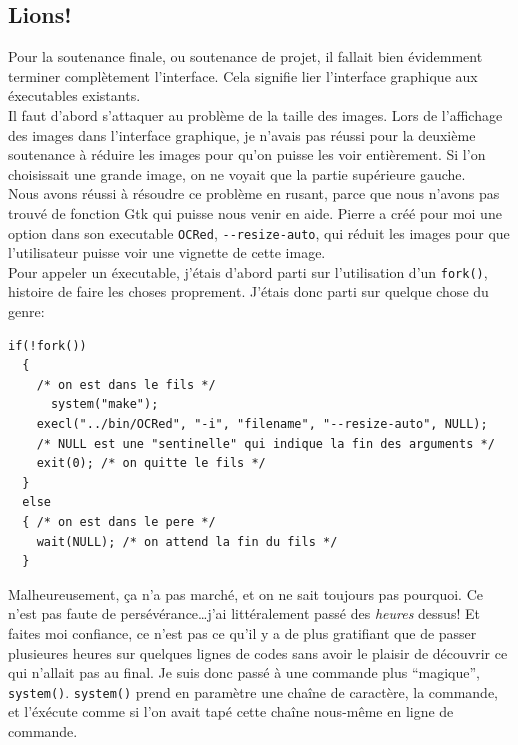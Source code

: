 \documentclass[a4paper,12pt]{report}
\begin{document}
\subsection{Lions!} %
\label{sub:lions_}
Pour la soutenance finale, ou soutenance de projet, il fallait bien \'evidemment terminer compl\`etement l'interface. Cela signifie lier l'interface graphique aux \'executables existants. \\
Il faut d'abord s'attaquer au probl\`eme de la taille des images. Lors de l'affichage des images dans l'interface graphique, je n'avais pas r\'eussi pour la deuxi\`eme soutenance \`a r\'eduire les images pour qu'on puisse les voir enti\`erement. Si l'on choisissait une grande image, on ne voyait que la partie sup\'erieure gauche.\\
Nous avons r\'eussi \`a r\'esoudre ce problème en rusant, parce que nous n'avons pas trouv\'e de fonction Gtk qui puisse nous venir en aide. Pierre a cr\'e\'e pour moi une option dans son executable \verb!OCRed!, \verb!--resize-auto!, qui r\'eduit les images pour que l'utilisateur puisse voir une vignette de cette image.\\
Pour appeler un \'executable, j'\'etais d'abord parti sur l'utilisation d'un \verb!fork()!, histoire de faire les choses proprement. J'\'etais donc parti sur quelque chose du genre:

\begin{lstlisting}
if(!fork())
  {
    /* on est dans le fils */
      system("make");  
    execl("../bin/OCRed", "-i", "filename", "--resize-auto", NULL);
    /* NULL est une "sentinelle" qui indique la fin des arguments */
    exit(0); /* on quitte le fils */
  }
  else
  { /* on est dans le pere */
    wait(NULL); /* on attend la fin du fils */
  }
\end{lstlisting}

Malheureusement, \c ca n'a pas march\'e, et on ne sait toujours pas pourquoi. Ce n'est pas faute de pers\'ev\'erance\ldots j'ai litt\'eralement pass\'e des \emph{heures} dessus! Et faites moi confiance, ce n'est pas ce qu'il y a de plus gratifiant que de passer plusieures heures sur quelques lignes de codes sans avoir le plaisir de d\'ecouvrir ce qui n'allait pas au final. Je suis donc pass\'e \`a une commande plus ``magique'', \verb!system()!. \verb!system()! prend en param\`etre une cha\^ine de caract\`ere, la commande, et l'\'ex\'ecute comme si l'on avait tap\'e cette cha\^ine nous-m\^eme en ligne de commande.
\end{document}
